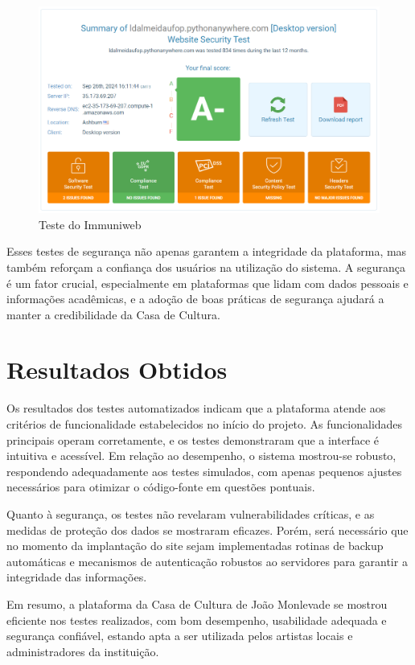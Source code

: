 \begin{figure}[htb] \caption{\label{fig_grafico}Teste do Immuniweb} \begin{center} \includegraphics[scale=0.3]{./img/immuniweb.png} \end{center}  \end{figure}

Esses testes de segurança não apenas garantem a integridade da plataforma, mas também reforçam a confiança dos usuários na utilização do sistema. A segurança é um fator crucial, especialmente em plataformas que lidam com dados pessoais e informações acadêmicas, e a adoção de boas práticas de segurança ajudará a manter a credibilidade da Casa de Cultura.

\section{Resultados Obtidos}


Os resultados dos testes automatizados indicam que a plataforma atende aos critérios de funcionalidade estabelecidos no início do projeto. As funcionalidades principais operam corretamente, e os testes demonstraram que a interface é intuitiva e acessível. Em relação ao desempenho, o sistema mostrou-se robusto, respondendo adequadamente aos testes simulados, com apenas pequenos ajustes necessários para otimizar o código-fonte em questões pontuais.

Quanto à segurança, os testes não revelaram vulnerabilidades críticas, e as medidas de proteção dos dados se mostraram eficazes. Porém, será necessário que no momento da implantação do site sejam implementadas rotinas de backup automáticas e mecanismos de autenticação robustos ao servidores para garantir a integridade das informações.

Em resumo, a plataforma da Casa de Cultura de João Monlevade se mostrou eficiente nos testes realizados, com bom desempenho, usabilidade adequada e segurança confiável, estando apta a ser utilizada pelos artistas locais e administradores da instituição.